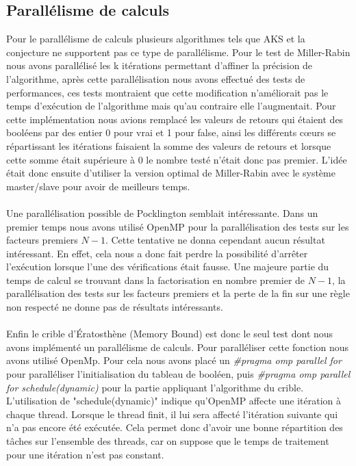		\subsection{Parallélisme de calculs}		
	Pour le parallélisme de calculs plusieurs algorithmes tels que AKS et la conjecture ne supportent pas ce type de parallélisme. Pour le test de Miller-Rabin nous avons parallélisé les k itérations permettant d'affiner la précision de l'algorithme, après cette parallélisation nous avons effectué des tests de performances, ces tests montraient que cette modification n'améliorait pas le temps d'exécution de l'algorithme mais qu'au contraire elle l'augmentait. Pour cette implémentation nous avions remplacé les valeurs de retours qui étaient des booléens par des entier 0 pour vrai et 1 pour false, ainsi les différents cœurs se répartissant les itérations faisaient la somme des valeurs de retours et lorsque cette somme était supérieure à 0 le nombre testé n'était donc pas premier. L'idée était donc ensuite d'utiliser la version optimal de Miller-Rabin avec le système master/slave pour avoir de meilleurs temps.
	
	\paragraph{}Une parallélisation possible de Pocklington semblait intéressante. Dans un premier temps nous avons utilisé OpenMP pour la parallélisation des tests sur les facteurs premiers $N-1$. Cette tentative ne donna cependant aucun résultat intéressant. En effet, cela nous a donc fait perdre la possibilité d'arrêter l'exécution lorsque l'une des vérifications était fausse. Une majeure partie du temps de calcul se trouvant dans la factorisation en nombre premier de $N-1$, la parallélisation des tests sur les facteurs premiers et la perte de la fin sur une règle non respecté ne donne pas de résultats intéressants. 
	
	\paragraph{}Enfin le crible d’Ératosthène (Memory Bound) est donc le seul test dont nous avons implémenté un parallélisme de calculs. Pour paralléliser cette fonction nous avons utilisé OpenMp. Pour cela nous avons placé un \textit{\#pragma omp parallel for} pour paralléliser l'initialisation du tableau de booléen, puis
\textit{\#pragma omp parallel for schedule(dynamic)}	pour la partie appliquant l'algorithme du crible. L'utilisation de "schedule(dynamic)" indique qu'OpenMP affecte une itération à chaque thread. Lorsque le thread finit, il lui sera affecté l’itération suivante qui n’a pas encore été exécutée. Cela permet donc d'avoir une bonne répartition des tâches sur l'ensemble des threads, car on suppose que le temps de traitement pour une itération n'est pas constant.
	
